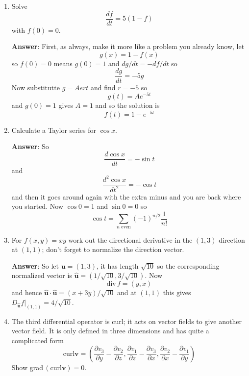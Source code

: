 \documentclass[12pt]{article}
\begin{document}
\begin{enumerate}

\item Solve
\begin{equation}
\frac{df}{dt}=5(1-f)
\end{equation}
with $f(0)=0$.

\textbf{Answer}:
First, as always, make it more like a problem you already know, let 
\begin{equation}
g(x)=1-f(x)
\end{equation}
so $f(0)=0$ means $g(0)=1$ and $dg/dt=-df/dt$ so
\begin{equation}
\frac{dg}{dt}=-5g
\end{equation}
Now substitutte $g=Ae{rt}$ and find $r=-5$ so
\begin{equation}
g(t)=Ae^{-5t}
\end{equation}
and $g(0)=1$ gives $A=1$ and so the solution is 
\begin{equation}
f(t)=1-e^{-5t}
\end{equation}

\item Calculate a Taylor series for $\cos{x}$. 

\textbf{Answer}: So
\begin{equation}
\frac{d\cos{x}}{dt}=-\sin{t}
\end{equation}
and 
\begin{equation}
\frac{d^2\cos{x}}{dt^2}=-\cos{t}
\end{equation}
and then it goes around again with the extra minus and you are back
where you started. Now $\cos{0}=1$ and $\sin{0}=0$ so
\begin{equation}
\cos{t}=\sum_{n\mbox{ even}} (-1)^{n/2}\frac{1}{n!}
\end{equation}

\item For $f(x,y)=xy$ work out the directional
  derivative in the $(1,3)$ direction at $(1,1)$; don't forget to
  normalize the direction vector.

\textbf{Answer}: So let $\mathbf{u}=(1,3)$, it has length $\sqrt{10}$ so the corresponding normalized vector is $\hat{\mathbf{u}}=(1/\sqrt{10},3/\sqrt{10})$. Now
\begin{equation}
\mbox{div}\,f=(y,x)
\end{equation}
and hence $\hat{\mathbf{u}}\cdot\hat{\mathbf{u}}=(x+3y)/\sqrt{10}$ and at $(1,1)$ this gives $D_{\hat{\mathbf{u}}}f|_{(1,1)}=4/\sqrt{10}$.

\item The third differential operator is curl; it acts on vector
  fields to give another vector field. It is only defined in three
  dimensions and has quite a complicated form
\begin{equation}
\mbox{curl}\mathbf{v}=\left(\frac{\partial v_3}{\partial y}-\frac{\partial v_2}{\partial z},\frac{\partial v_1}{\partial z}-\frac{\partial v_3}{\partial x},\frac{\partial v_2}{\partial x}-\frac{\partial v_1}{\partial y}\right)
\end{equation}
Show grad$\,(\mbox{curl}\mathbf{v})=0$.


\end{enumerate}
\end{document}
